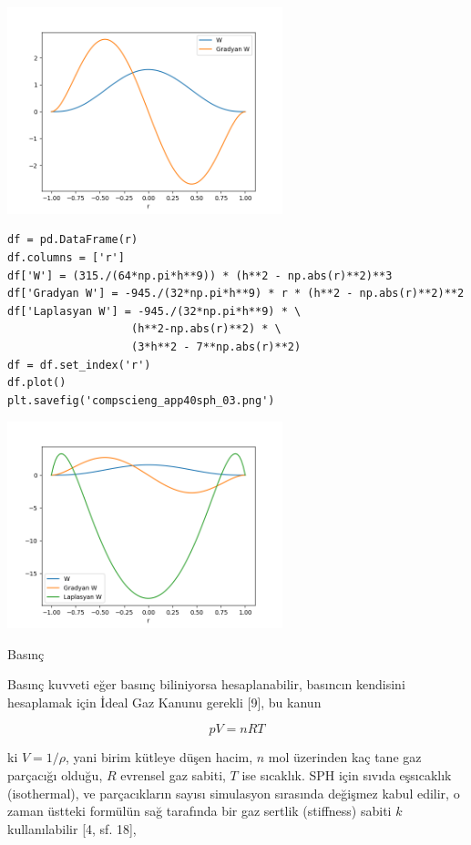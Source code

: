 \documentclass[12pt,fleqn]{article}\usepackage{../../common}
\begin{document}
\includegraphics[height=6cm]{compscieng_app40sph_02.png}

\begin{verbatim}
df = pd.DataFrame(r)
df.columns = ['r']
df['W'] = (315./(64*np.pi*h**9)) * (h**2 - np.abs(r)**2)**3
df['Gradyan W'] = -945./(32*np.pi*h**9) * r * (h**2 - np.abs(r)**2)**2
df['Laplasyan W'] = -945./(32*np.pi*h**9) * \
                   (h**2-np.abs(r)**2) * \
                   (3*h**2 - 7**np.abs(r)**2)
df = df.set_index('r')
df.plot()
plt.savefig('compscieng_app40sph_03.png')
\end{verbatim}

\includegraphics[height=6cm]{compscieng_app40sph_03.png}

Basınç

Basınç kuvveti eğer basınç biliniyorsa hesaplanabilir, basıncın kendisini
hesaplamak için İdeal Gaz Kanunu gerekli [9], bu kanun

$$
p V = n R T
$$

ki $V = 1 / \rho$, yani birim kütleye düşen hacim, $n$ mol üzerinden kaç tane
gaz parçacığı olduğu, $R$ evrensel gaz sabiti, $T$ ise sıcaklık. SPH için sıvıda
eşsıcaklık (isothermal), ve parçacıkların sayısı simulasyon sırasında değişmez
kabul edilir, o zaman üstteki formülün sağ tarafında bir gaz sertlik (stiffness)
sabiti $k$ kullanılabilir [4, sf. 18], 
\end{document}
